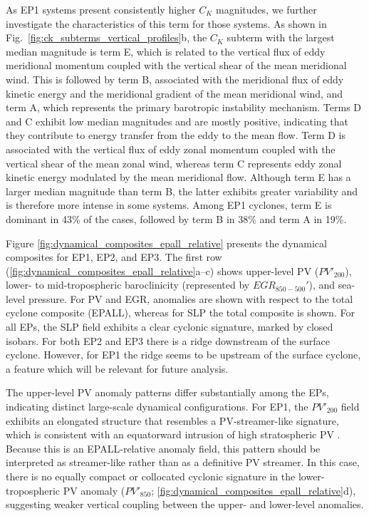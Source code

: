 \documentclass[pdflatex,sn-chicago]{sn-jnl}%
\theoremstyle{plain}
\theoremstyle{definition}
\theoremstyle{remark}
\theoremstyle{definition}
\begin{document}
As EP1 systems present consistently higher $C_K$ magnitudes, we further investigate the characteristics of this term for those systems. As shown in Fig.~\ref{fig:ck_subterms_vertical_profiles}b, the $C_K$ subterm with the largest median magnitude is term E, which is related to the vertical flux of eddy meridional momentum coupled with the vertical shear of the mean meridional wind. This is followed by term B, associated with the meridional flux of eddy kinetic energy and the meridional gradient of the mean meridional wind, and term A, which represents the primary barotropic instability mechanism. Terms D and C exhibit low median magnitudes and are mostly positive, indicating that they contribute to energy transfer from the eddy to the mean flow. Term D is associated with the vertical flux of eddy zonal momentum coupled with the vertical shear of the mean zonal wind, whereas term C represents eddy zonal kinetic energy modulated by the mean meridional flow. Although term E has a larger median magnitude than term B, the latter exhibits greater variability and is therefore more intense in some systems. Among EP1 cyclones, term E is dominant in 43\% of the cases, followed by term B in 38\% and term A in 19\%.

Figure \ref{fig:dynamical_composites_epall_relative} presents the dynamical composites for EP1, EP2, and EP3. The first row (\ref{fig:dynamical_composites_epall_relative}a--c) shows upper-level PV ($PV'_{200}$), lower- to mid-tropospheric baroclinicity (represented by $EGR_{850-500}'$), and sea-level pressure. For PV and EGR, anomalies are shown with respect to the total cyclone composite (EPALL), whereas for SLP the total composite is shown. For all EPs, the SLP field exhibits a clear cyclonic signature, marked by closed isobars. For both EP2 and EP3 there is a ridge downstream of the surface cyclone. However, for EP1 the ridge seems to be upstream of the surface cyclone, a feature which will be relevant for future analysis.

The upper-level PV anomaly patterns differ substantially among the EPs, indicating distinct large-scale dynamical configurations. For EP1, the $PV'_{200}$ field exhibits an elongated structure that resembles a PV-streamer-like signature, which is consistent with an equatorward intrusion of high stratospheric PV \citep[e.g.,][]{hoskins1985use,hu2004variations,wernli2007identification}. Because this is an EPALL-relative anomaly field, this pattern should be interpreted as streamer-like rather than as a definitive PV streamer. In this case, there is no equally compact or collocated cyclonic signature in the lower-tropospheric PV anomaly ($PV'_{850}$; \ref{fig:dynamical_composites_epall_relative}d), suggesting weaker vertical coupling between the upper- and lower-level anomalies.
\end{document}
